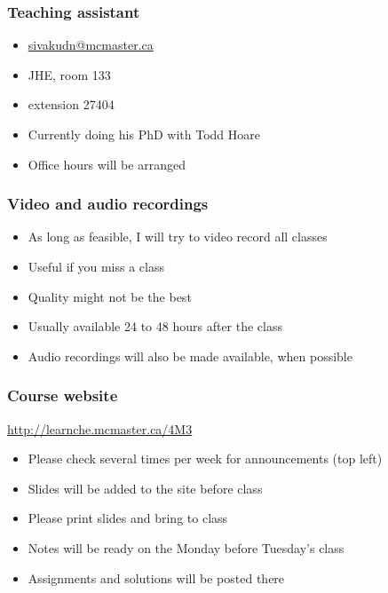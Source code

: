 \begin{frame}\frametitle{Teaching assistant}
	{\color{myGreen}{Daryl Sivakumaran}}
	\begin{itemize}
		\item	\url{sivakudn@mcmaster.ca}
		\item	JHE, room 133
		\item	extension 27404
		\item	Currently doing his PhD with Todd Hoare
		\item	Office hours will be arranged
	\end{itemize}
\end{frame}

\begin{frame}\frametitle{Video and audio recordings}
	\begin{itemize}
		\item	As long as feasible, I will try to video record all classes
		\item	Useful if you miss a class
		\item	Quality might not be the best
		\item	Usually available 24 to 48 hours after the class
		\item	Audio recordings will also be made available, when possible
	\end{itemize}
\end{frame}

\begin{frame}\frametitle{Course website}
	
	\begin{exampleblock}{}
		\centering 
		\href{http://learnche.mcmaster.ca/4M3}{http://learnche.mcmaster.ca/4M3}
	\end{exampleblock}
	\begin{itemize}
		\item	Please check several times per week for announcements (top left)
		\item	Slides will be added to the site before class
		\item	Please print slides and bring to class
		\item	Notes will be ready on the Monday before Tuesday's class
		\item	Assignments and solutions will be posted there
	\end{itemize}
\end{frame}

